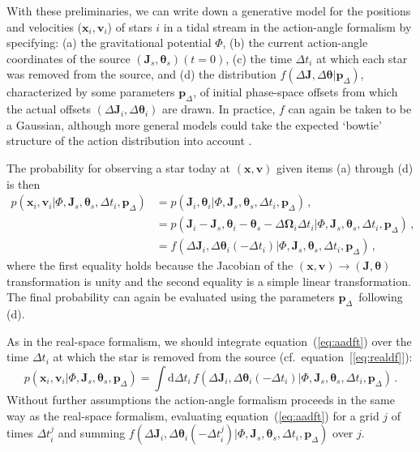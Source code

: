 \documentclass[12pt,preprint]{aastex}
\newcommand{\dd}{\mathrm{d}}
\newcommand{\eqnname}{equation}
\renewcommand{\vec}[1]{\ensuremath{\mathbf{#1}}}
\newcommand{\vecx}{\ensuremath{\vec{x}}}
\newcommand{\vecv}{\ensuremath{\vec{v}}}
\newcommand{\vecj}{\ensuremath{\vec{J}}}
\newcommand{\veco}{\ensuremath{\vec{\Omega}}}
\newcommand{\veca}{\ensuremath{\boldsymbol\theta}}
\newcommand{\paramsdiff}{\ensuremath{\vec{p}_\Delta}}
\begin{document}
With these preliminaries, we can write down a generative model for the
positions and velocities ($\vecx_i,\vecv_i$) of stars $i$ in a tidal
stream in the action-angle formalism by specifying: (a) the
gravitational potential $\Phi$, (b) the current action-angle
coordinates of the source $(\vecj_s,\veca_s)(t=0)$, (c) the time
$\Delta t_i$ at which each star was removed from the source, and (d)
the distribution $f(\Delta \vecj,\Delta \veca|\paramsdiff)$,
characterized by some parameters $\paramsdiff$, of initial phase-space
offsets from which the actual offsets $(\Delta \vecj_i,\Delta
\veca_i)$ are drawn. In practice, $f$ can again be taken to be a
Gaussian, although more general models could take the expected
`bowtie' structure of the action distribution into account
\citep{Eyre11a}. 

The probability for observing a star today at $(\vecx,\vecv)$ given
items (a) through (d) is then
\begin{align}\label{eq:aadft}
  p(\vecx_i,\vecv_i | \Phi,\vecj_s,\veca_s,\Delta t_i,\paramsdiff) 
  & = p(\vecj_i,\veca_i | \Phi,\vecj_s,\veca_s,\Delta t_i,\paramsdiff) \,,\nonumber\\
  & = p(\vecj_i-\vecj_s,\veca_i-\veca_s-\Delta \veco_i\Delta t_i | \Phi,\vecj_s,\veca_s,\Delta t_i,\paramsdiff) \,,\\
  & = f(\Delta \vecj_i,\Delta \veca_i(-\Delta t_i) | \Phi,\vecj_s,\veca_s,\Delta t_i,\paramsdiff) \,,\nonumber
\end{align}
where the first equality holds because the Jacobian of the
$(\vecx,\vecv)\rightarrow(\vecj,\veca)$ transformation is unity and
the second equality is a simple linear transformation. The final
probability can again be evaluated using the parameters
\paramsdiff\ following (d).

As in the real-space formalism, we should integrate
\eqnname~(\ref{eq:aadft}) over the time $\Delta t_i$ at which the star
is removed from the source (cf.~\eqnname~[\ref{eq:realdf}]):
\begin{equation}\label{eq:aadf}
  p(\vecx_i,\vecv_i | \Phi,\vecj_s,\veca_s,\paramsdiff) = \int \dd
  \Delta t_i\, f(\Delta \vecj_i,\Delta \veca_i(-\Delta t_i) |
  \Phi,\vecj_s,\veca_s,\Delta t_i,\paramsdiff) \,.
\end{equation}
Without further assumptions the action-angle formalism proceeds in the
same way as the real-space formalism, evaluating
\eqnname~(\ref{eq:aadft}) for a grid $j$ of times $\Delta t_i^j$ and
summing $f(\Delta \vecj_i,\Delta \veca_i(-\Delta t^j_i) |
\Phi,\vecj_s,\veca_s,\Delta t_i,\paramsdiff)$ over $j$.
\end{document}
